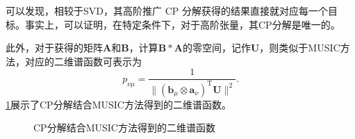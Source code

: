 可以发现，相较于SVD，其高阶推广 CP 分解获得的结果直接就对应每一个目标。事实上，可以证明，在特定条件下，对于高阶张量，其CP分解是唯一的。

此外，对于获得的矩阵\( \mathbf{A} \)和\( \mathbf{B} \)，计算\( \mathbf{B} \ast \mathbf{A} \)的零空间，记作\( \mathbf{U} \)，则类似于MUSIC方法，对应的二维谱函数可表示为
\[
    p_{\nu\mu} = \frac{1}{\| (\bm{b}_{\mu} \otimes \bm{a}_{\nu})^{\mathrm{T}} \mathbf{U} \|^2}.
\]
\cref{fig_cp_music}展示了CP分解结合MUSIC方法得到的二维谱函数。

\begin{figure}[htb!]
    \centering
    \caption{CP分解结合MUSIC方法得到的二维谱函数}
    \label{fig_cp_music}
\end{figure}
